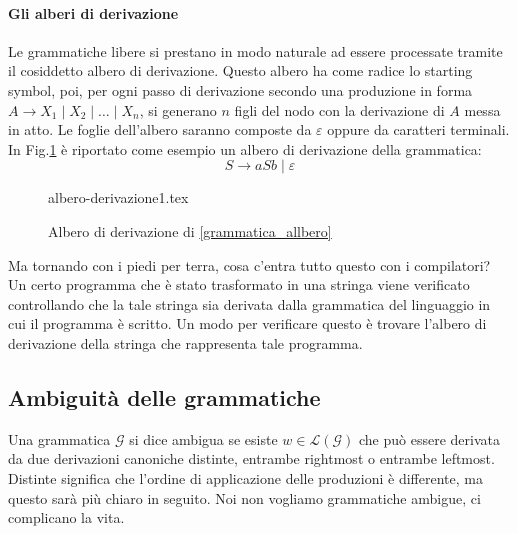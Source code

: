 \documentclass[class=book, crop=false, oneside, 12pt]{standalone}
\begin{document}
\paragraph{Gli alberi di derivazione}
Le grammatiche libere si prestano in modo naturale ad essere processate tramite il cosiddetto albero di derivazione. Questo albero ha come radice lo starting symbol, poi, per ogni passo di derivazione secondo una produzione in forma \(A \to X_1 \mid X_2 \mid\dots\mid X_n \), si generano \(n\) figli del nodo con la derivazione di \(A\) messa in atto.
Le foglie dell’albero saranno composte da \(\varepsilon\) oppure da caratteri terminali. In Fig.\ref{albero_di_derivazione} è riportato come esempio un albero di derivazione della grammatica:
\begin{equation}
    S \to aSb \mid \varepsilon
    \label{grammatica_allbero}
\end{equation}
\begin{figure}[H]
	\centering
    {albero-derivazione1.tex}
    \caption{Albero di derivazione di \ref{grammatica_allbero}}
    \label{albero_di_derivazione}
\end{figure}
Ma tornando con i piedi per terra, cosa c'entra tutto questo con i compilatori?\\
Un certo programma che è stato trasformato in una stringa viene verificato controllando che la tale stringa sia derivata dalla grammatica del linguaggio in cui il programma è scritto. Un modo per verificare questo è trovare l’albero di derivazione della stringa che rappresenta tale programma.

\subsection{Ambiguità delle grammatiche}\label{sec:ambiguity}
Una grammatica \(\mathcal{G}\) si dice ambigua se esiste \(w \in \mathcal{L}(\mathcal{G})\) che può essere derivata da due derivazioni canoniche distinte, entrambe rightmost o entrambe leftmost. Distinte significa che l'ordine di applicazione delle produzioni è differente, ma questo sarà più chiaro in seguito. Noi non vogliamo grammatiche ambigue, ci complicano la vita. 
\end{document}
